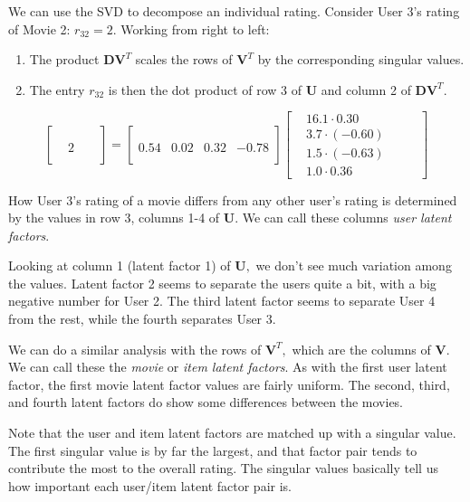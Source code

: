 \documentclass[
]{book}
\theoremstyle{definition}
\theoremstyle{definition}
\theoremstyle{definition}
\theoremstyle{definition}
\theoremstyle{remark}
\begin{document}
We can use the SVD to decompose an individual rating. Consider User 3's rating of Movie 2: \(r_{32}=2.\) Working from right to left:

\begin{enumerate}
\def\labelenumi{\arabic{enumi}.}
\item
  The product \(\mathbf{D}\mathbf{V}^T\) scales the rows of \(\mathbf{V}^T\) by the corresponding singular values.
\item
  The entry \(r_{32}\) is then the dot product of row 3 of \(\mathbf{U}\) and column 2 of \(\mathbf{D}\mathbf{V}^T.\)
\end{enumerate}

\[\begin{bmatrix} &&&\\&&&\\&2&&\\&&&\end{bmatrix}=\begin{bmatrix}&&&\\&&&\\0.54 & 0.02 & 0.32 & -0.78\\&&&\end{bmatrix}\begin{bmatrix}&16.1\cdot 0.30 &&&\\&3.7\cdot (-0.60)&&&\\&1.5\cdot (-0.63)&&&\\&1.0\cdot 0.36&&&\end{bmatrix}\]

How User 3's rating of a movie differs from any other user's rating is determined by the values in row 3, columns 1-4 of \(\mathbf{U}\). We can call these columns \emph{user latent factors}.

Looking at column 1 (latent factor 1) of \(\mathbf{U},\) we don't see much variation among the values. Latent factor 2 seems to separate the users quite a bit, with a big negative number for User 2. The third latent factor seems to separate User 4 from the rest, while the fourth separates User 3.

We can do a similar analysis with the rows of \(\mathbf{V}^T,\) which are the columns of \(\mathbf{V}.\) We can call these the \emph{movie} or \emph{item latent factors}. As with the first user latent factor, the first movie latent factor values are fairly uniform. The second, third, and fourth latent factors do show some differences between the movies.

Note that the user and item latent factors are matched up with a singular value. The first singular value is by far the largest, and that factor pair tends to contribute the most to the overall rating. The singular values basically tell us how important each user/item latent factor pair is.
\end{document}

